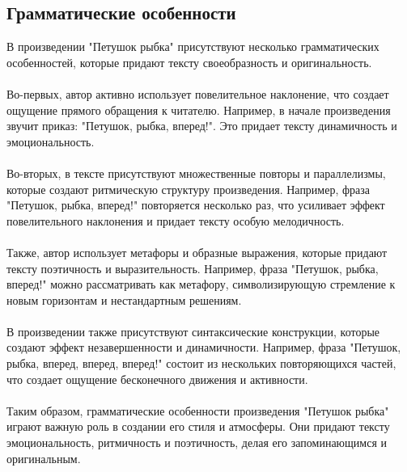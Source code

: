 \documentclass{article}
\begin{document}
\subsection{Грамматические особенности}
В произведении "{}{}Петушок рыбка"{}{} присутствуют несколько грамматических особенностей, которые придают тексту своеобразность и оригинальность.\\
~\\
Во-первых, автор активно использует повелительное наклонение, что создает ощущение прямого обращения к читателю. Например, в начале произведения звучит приказ: "{}{}Петушок, рыбка, вперед!"{}{}. Это придает тексту динамичность и эмоциональность.\\
~\\
Во-вторых, в тексте присутствуют множественные повторы и параллелизмы, которые создают ритмическую структуру произведения. Например, фраза "{}{}Петушок, рыбка, вперед!"{}{} повторяется несколько раз, что усиливает эффект повелительного наклонения и придает тексту особую мелодичность.\\
~\\
Также, автор использует метафоры и образные выражения, которые придают тексту поэтичность и выразительность. Например, фраза "{}{}Петушок, рыбка, вперед!"{}{} можно рассматривать как метафору, символизирующую стремление к новым горизонтам и нестандартным решениям.\\
~\\
В произведении также присутствуют синтаксические конструкции, которые создают эффект незавершенности и динамичности. Например, фраза "{}{}Петушок, рыбка, вперед, вперед, вперед!"{}{} состоит из нескольких повторяющихся частей, что создает ощущение бесконечного движения и активности.\\
~\\
Таким образом, грамматические особенности произведения "{}{}Петушок рыбка"{}{} играют важную роль в создании его стиля и атмосферы. Они придают тексту эмоциональность, ритмичность и поэтичность, делая его запоминающимся и оригинальным.\\
~\\

\newpage
\end{document}
